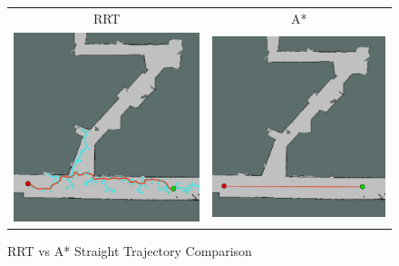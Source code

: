 \documentclass{article}
\begin{document}
\begin{figure}[h]
\begin{center}
\begin{tabular}{c|c}
    RRT & A* \\
    \includegraphics[scale=.5]{RRT-Straight.png} & 
    \includegraphics[scale=.5]{A_Star_Straight.png} & 
\end{tabular}
\caption{RRT vs A* Straight Trajectory Comparison}
\end{center}
\end{figure} 
\end{document}
